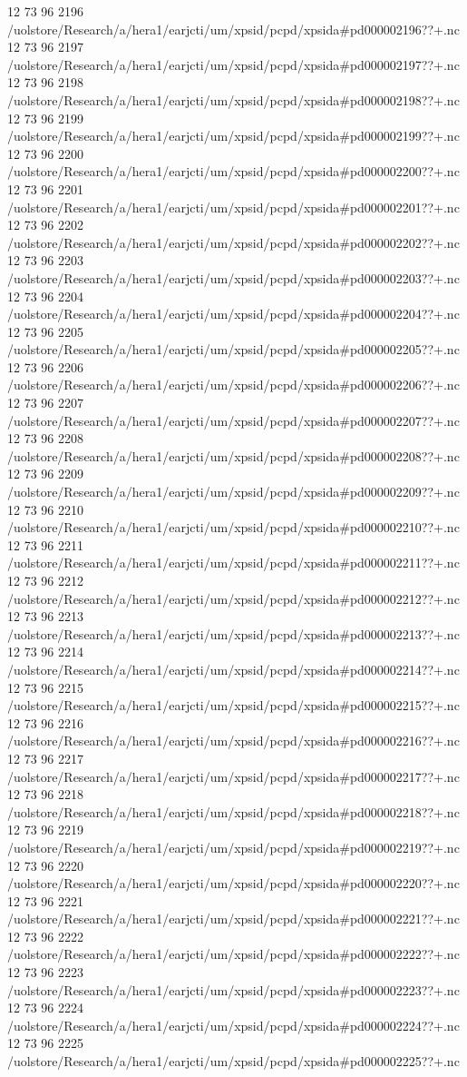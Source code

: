 12 73 96
2196
/uolstore/Research/a/hera1/earjcti/um/xpsid/pcpd/xpsida#pd000002196??+.nc
12 73 96
2197
/uolstore/Research/a/hera1/earjcti/um/xpsid/pcpd/xpsida#pd000002197??+.nc
12 73 96
2198
/uolstore/Research/a/hera1/earjcti/um/xpsid/pcpd/xpsida#pd000002198??+.nc
12 73 96
2199
/uolstore/Research/a/hera1/earjcti/um/xpsid/pcpd/xpsida#pd000002199??+.nc
12 73 96
2200
/uolstore/Research/a/hera1/earjcti/um/xpsid/pcpd/xpsida#pd000002200??+.nc
12 73 96
2201
/uolstore/Research/a/hera1/earjcti/um/xpsid/pcpd/xpsida#pd000002201??+.nc
12 73 96
2202
/uolstore/Research/a/hera1/earjcti/um/xpsid/pcpd/xpsida#pd000002202??+.nc
12 73 96
2203
/uolstore/Research/a/hera1/earjcti/um/xpsid/pcpd/xpsida#pd000002203??+.nc
12 73 96
2204
/uolstore/Research/a/hera1/earjcti/um/xpsid/pcpd/xpsida#pd000002204??+.nc
12 73 96
2205
/uolstore/Research/a/hera1/earjcti/um/xpsid/pcpd/xpsida#pd000002205??+.nc
12 73 96
2206
/uolstore/Research/a/hera1/earjcti/um/xpsid/pcpd/xpsida#pd000002206??+.nc
12 73 96
2207
/uolstore/Research/a/hera1/earjcti/um/xpsid/pcpd/xpsida#pd000002207??+.nc
12 73 96
2208
/uolstore/Research/a/hera1/earjcti/um/xpsid/pcpd/xpsida#pd000002208??+.nc
12 73 96
2209
/uolstore/Research/a/hera1/earjcti/um/xpsid/pcpd/xpsida#pd000002209??+.nc
12 73 96
2210
/uolstore/Research/a/hera1/earjcti/um/xpsid/pcpd/xpsida#pd000002210??+.nc
12 73 96
2211
/uolstore/Research/a/hera1/earjcti/um/xpsid/pcpd/xpsida#pd000002211??+.nc
12 73 96
2212
/uolstore/Research/a/hera1/earjcti/um/xpsid/pcpd/xpsida#pd000002212??+.nc
12 73 96
2213
/uolstore/Research/a/hera1/earjcti/um/xpsid/pcpd/xpsida#pd000002213??+.nc
12 73 96
2214
/uolstore/Research/a/hera1/earjcti/um/xpsid/pcpd/xpsida#pd000002214??+.nc
12 73 96
2215
/uolstore/Research/a/hera1/earjcti/um/xpsid/pcpd/xpsida#pd000002215??+.nc
12 73 96
2216
/uolstore/Research/a/hera1/earjcti/um/xpsid/pcpd/xpsida#pd000002216??+.nc
12 73 96
2217
/uolstore/Research/a/hera1/earjcti/um/xpsid/pcpd/xpsida#pd000002217??+.nc
12 73 96
2218
/uolstore/Research/a/hera1/earjcti/um/xpsid/pcpd/xpsida#pd000002218??+.nc
12 73 96
2219
/uolstore/Research/a/hera1/earjcti/um/xpsid/pcpd/xpsida#pd000002219??+.nc
12 73 96
2220
/uolstore/Research/a/hera1/earjcti/um/xpsid/pcpd/xpsida#pd000002220??+.nc
12 73 96
2221
/uolstore/Research/a/hera1/earjcti/um/xpsid/pcpd/xpsida#pd000002221??+.nc
12 73 96
2222
/uolstore/Research/a/hera1/earjcti/um/xpsid/pcpd/xpsida#pd000002222??+.nc
12 73 96
2223
/uolstore/Research/a/hera1/earjcti/um/xpsid/pcpd/xpsida#pd000002223??+.nc
12 73 96
2224
/uolstore/Research/a/hera1/earjcti/um/xpsid/pcpd/xpsida#pd000002224??+.nc
12 73 96
2225
/uolstore/Research/a/hera1/earjcti/um/xpsid/pcpd/xpsida#pd000002225??+.nc
